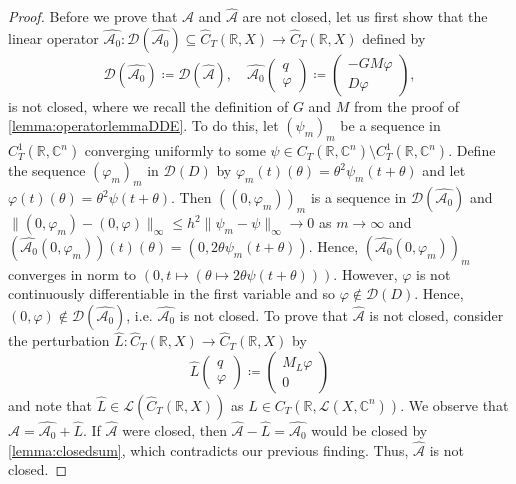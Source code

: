 \documentclass[english]{myarticle}
\begin{document}
\begin{sloppypar}
\begin{proof}
Before we prove that $\mathcal{A}$ and $\hat{\mathcal{A}}$ are not closed, let us first show that the linear operator $\hat{\mathcal{A}_0} : \mathcal{D}(\hat{\mathcal{A}_0}) \subseteq \hat{C}_T(\mathbb{R},X) \to \hat{C}_T(\mathbb{R},X)$ defined by
\begin{equation*}
    \mathcal{D}(\hat{\mathcal{A}_0}) \coloneqq \mathcal{D}(\hat{\mathcal{A}}), \quad \hat{\mathcal{A}_0}
    \begin{pmatrix}
    q\\
    \varphi
    \end{pmatrix}
    \coloneqq
    \begin{pmatrix}
    -GM\varphi \\
    D\varphi
    \end{pmatrix},
\end{equation*}
is not closed, where we recall the definition of $G$ and $M$ from the proof of \cref{lemma:operatorlemmaDDE}. To do this, let $(\psi_m)_m$ be a sequence in $C_T^1(\mathbb{R},\mathbb{C}^n)$ converging uniformly to some $\psi \in C_T(\mathbb{R},\mathbb{C}^n) \setminus C_T^1(\mathbb{R},\mathbb{C}^n)$. Define the sequence $(\varphi_m)_m$ in $\mathcal{D}(D)$ by $\varphi_m(t)(\theta) = \theta^2 \psi_m(t+\theta)$ and let $\varphi(t)(\theta) = \theta^2 \psi(t+\theta)$. Then $((0,\varphi_m))_m$ is a sequence in $\mathcal{D}(\hat{\mathcal{A}_0})$ and $\| (0,\varphi_m) - (0,\varphi) \|_\infty \leq h^2 \| \psi_m - \psi \|_\infty \to 0$ as $m \to \infty$ and $(\hat{\mathcal{A}_0}(0,\varphi_m))(t)(\theta) = (0, 2 \theta \psi_m(t+\theta))$. Hence, $(\hat{\mathcal{A}_0}(0,\varphi_m))_m$ converges in norm to $(0, t \mapsto (\theta \mapsto 2 \theta \psi(t+\theta)))$. However, $\varphi$ is not continuously differentiable in the first variable and so $\varphi \notin \mathcal{D}(D)$. Hence, $(0,\varphi) \notin \mathcal{D}(\hat{\mathcal{A}_0})$, i.e. $\hat{\mathcal{A}_0}$ is not closed. To prove that $\hat{\mathcal{A}}$ is not closed, consider the perturbation $\hat{L} : \hat{C}_T(\mathbb{R},X) \to \hat{C}_T(\mathbb{R},X)$ by 
\begin{equation*}
    \hat{L}
    \begin{pmatrix}
    q \\
    \varphi
    \end{pmatrix}
    \coloneqq
    \begin{pmatrix}
    M_L \varphi \\
    0
    \end{pmatrix}
\end{equation*}
and note that $\hat{L} \in \mathcal{L}(\hat{C}_T(\mathbb{R},X))$ as $L \in C_T(\mathbb{R},\mathcal{L}(X,\mathbb{C}^n))$. We observe that $\hat{\mathcal{A}} = \hat{\mathcal{A}_0} + \hat{L}$. If $\hat{\mathcal{A}}$ were closed, then $\hat{\mathcal{A}} - \hat{L} = \hat{\mathcal{A}_0}$ would be closed by \cref{lemma:closedsum}, which contradicts our previous finding. Thus, $\hat{\mathcal{A}}$ is not closed.


\end{proof}
\end{sloppypar}
\end{document}
